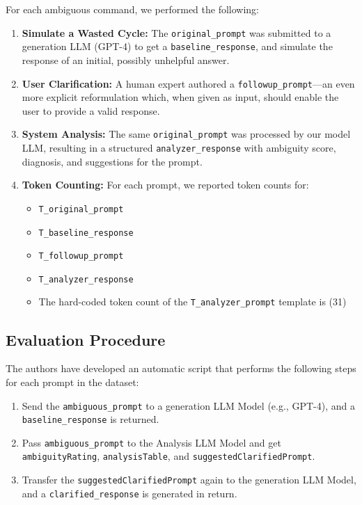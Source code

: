 \documentclass[11pt,a4paper]{article}
\begin{document}
For each ambiguous command, we performed the following:
\begin{enumerate}
    \item \textbf{Simulate a Wasted Cycle:}
    The \texttt{original\_prompt} was submitted to a generation LLM (GPT-4) to get a \texttt{baseline\_response}, and simulate the response of an initial, possibly unhelpful answer.
    \item \textbf{User Clarification:}
    A human expert authored a \texttt{followup\_prompt}—an even more explicit reformulation which, when given as input, should enable the user to provide a valid response.
    \item \textbf{System Analysis:}
    The same \texttt{original\_prompt} was processed by our model LLM, resulting in a structured \texttt{analyzer\_response} with ambiguity score, diagnosis, and suggestions for the prompt.
    \item \textbf{Token Counting:}
    For each prompt, we reported token counts for:
    \begin{itemize}
        \item \texttt{T\_original\_prompt}
        \item \texttt{T\_baseline\_response}
        \item \texttt{T\_followup\_prompt}
        \item \texttt{T\_analyzer\_response}
        \item The hard-coded token count of the \texttt{T\_analyzer\_prompt} template is (31)
    \end{itemize}
\end{enumerate}

\subsection{Evaluation Procedure}
The authors have developed an automatic script that performs the following steps for each prompt in the dataset:
\begin{enumerate}
   \item Send the \texttt{ambiguous\_prompt} to a generation LLM Model (e.g., GPT-4), and a  \texttt{baseline\_response} is returned.
    \item Pass \texttt{ambiguous\_prompt} to the Analysis LLM Model and get \texttt{ambiguityRating}, \texttt{analysisTable}, and \texttt{suggestedClarifiedPrompt}.
    \item Transfer the \texttt{suggestedClarifiedPrompt} again to the generation LLM Model, and a \texttt{clarified\_response} is generated in return.
\end{enumerate}
\end{document}

